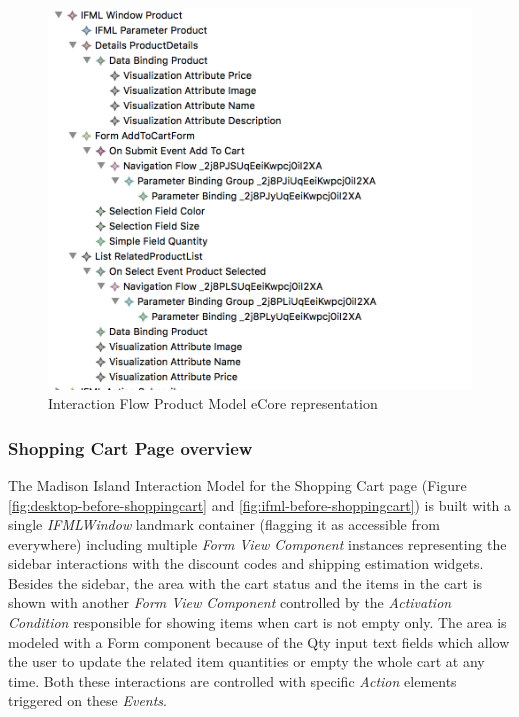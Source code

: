 \vspace{0.5cm}
\begin{figure}[H]
  \centering
    \includegraphics[width=13cm]{images/diagrams/before/ifml-hierarchy-product.png}
  \caption{Interaction Flow Product Model eCore representation}
  \label{fig:ifml-before-hierarchy-product}
\end{figure}
\vspace{0.5cm}

\subsubsection{Shopping Cart Page overview}

The Madison Island Interaction Model for the Shopping Cart page (Figure \ref{fig:desktop-before-shoppingcart} and \ref{fig:ifml-before-shoppingcart}) is  built with a single \textit{IFMLWindow} landmark container (flagging it as accessible from everywhere) including multiple \textit{Form View Component} instances representing the sidebar interactions with the discount codes and shipping estimation widgets. Besides the sidebar, the area with the cart status and the items in the cart is shown with another \textit{Form View Component} controlled by the \textit{Activation Condition} responsible for showing items when cart is not empty only. The area is modeled with a Form component because of the Qty input text fields which allow the user to update the related item quantities or empty the whole cart at any time. Both these interactions are controlled with specific \textit{Action} elements triggered on these \textit{Events}.

